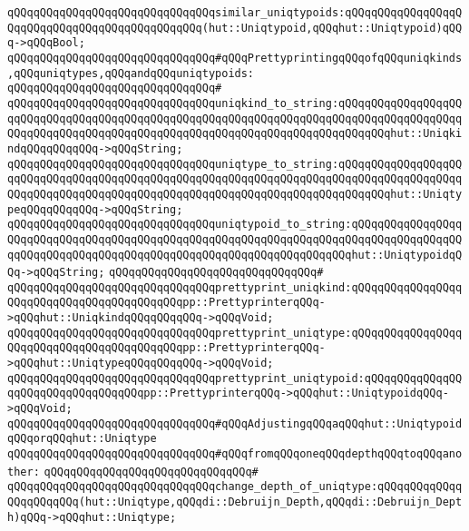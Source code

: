 \verb|qQQqqQQqqQQqqQQqqQQqqQQqqQQqqQQqsimilar_uniqtypoids:qQQqqQQqqQQqqQQqqQQqqQQqqQQqqQQqqQQqqQQqqQQqqQQq(hut::Uniqtypoid,qQQqhut::Uniqtypoid)qQQq->qQQqBool;|\newline
\newline
\verb|qQQqqQQqqQQqqQQqqQQqqQQqqQQqqQQq#qQQqPrettyprintingqQQqofqQQquniqkinds,qQQquniqtypes,qQQqandqQQquniqtypoids:|\newline
\verb|qQQqqQQqqQQqqQQqqQQqqQQqqQQqqQQq#|\newline
\verb|qQQqqQQqqQQqqQQqqQQqqQQqqQQqqQQquniqkind_to_string:qQQqqQQqqQQqqQQqqQQqqQQqqQQqqQQqqQQqqQQqqQQqqQQqqQQqqQQqqQQqqQQqqQQqqQQqqQQqqQQqqQQqqQQqqQQqqQQqqQQqqQQqqQQqqQQqqQQqqQQqqQQqqQQqqQQqqQQqqQQqqQQqqQQqhut::UniqkindqQQqqQQqqQQq->qQQqString;|\newline
\verb|qQQqqQQqqQQqqQQqqQQqqQQqqQQqqQQquniqtype_to_string:qQQqqQQqqQQqqQQqqQQqqQQqqQQqqQQqqQQqqQQqqQQqqQQqqQQqqQQqqQQqqQQqqQQqqQQqqQQqqQQqqQQqqQQqqQQqqQQqqQQqqQQqqQQqqQQqqQQqqQQqqQQqqQQqqQQqqQQqqQQqqQQqqQQqhut::UniqtypeqQQqqQQqqQQq->qQQqString;|\newline
\verb|qQQqqQQqqQQqqQQqqQQqqQQqqQQqqQQquniqtypoid_to_string:qQQqqQQqqQQqqQQqqQQqqQQqqQQqqQQqqQQqqQQqqQQqqQQqqQQqqQQqqQQqqQQqqQQqqQQqqQQqqQQqqQQqqQQqqQQqqQQqqQQqqQQqqQQqqQQqqQQqqQQqqQQqqQQqqQQqqQQqqQQqhut::UniqtypoidqQQq->qQQqString;|\newline
\verb|qQQqqQQqqQQqqQQqqQQqqQQqqQQqqQQq#|\newline
\verb|qQQqqQQqqQQqqQQqqQQqqQQqqQQqqQQqprettyprint_uniqkind:qQQqqQQqqQQqqQQqqQQqqQQqqQQqqQQqqQQqqQQqqQQqpp::PrettyprinterqQQq->qQQqhut::UniqkindqQQqqQQqqQQq->qQQqVoid;|\newline
\verb|qQQqqQQqqQQqqQQqqQQqqQQqqQQqqQQqprettyprint_uniqtype:qQQqqQQqqQQqqQQqqQQqqQQqqQQqqQQqqQQqqQQqqQQqpp::PrettyprinterqQQq->qQQqhut::UniqtypeqQQqqQQqqQQq->qQQqVoid;|\newline
\verb|qQQqqQQqqQQqqQQqqQQqqQQqqQQqqQQqprettyprint_uniqtypoid:qQQqqQQqqQQqqQQqqQQqqQQqqQQqqQQqqQQqpp::PrettyprinterqQQq->qQQqhut::UniqtypoidqQQq->qQQqVoid;|\newline
\newline
\verb|qQQqqQQqqQQqqQQqqQQqqQQqqQQqqQQq#qQQqAdjustingqQQqaqQQqhut::UniqtypoidqQQqorqQQqhut::Uniqtype|\newline
\verb|qQQqqQQqqQQqqQQqqQQqqQQqqQQqqQQq#qQQqfromqQQqoneqQQqdepthqQQqtoqQQqanother:|\newline
\verb|qQQqqQQqqQQqqQQqqQQqqQQqqQQqqQQq#|\newline
\verb|qQQqqQQqqQQqqQQqqQQqqQQqqQQqqQQqchange_depth_of_uniqtype:qQQqqQQqqQQqqQQqqQQqqQQq(hut::Uniqtype,qQQqdi::Debruijn_Depth,qQQqdi::Debruijn_Depth)qQQq->qQQqhut::Uniqtype;|\newline
